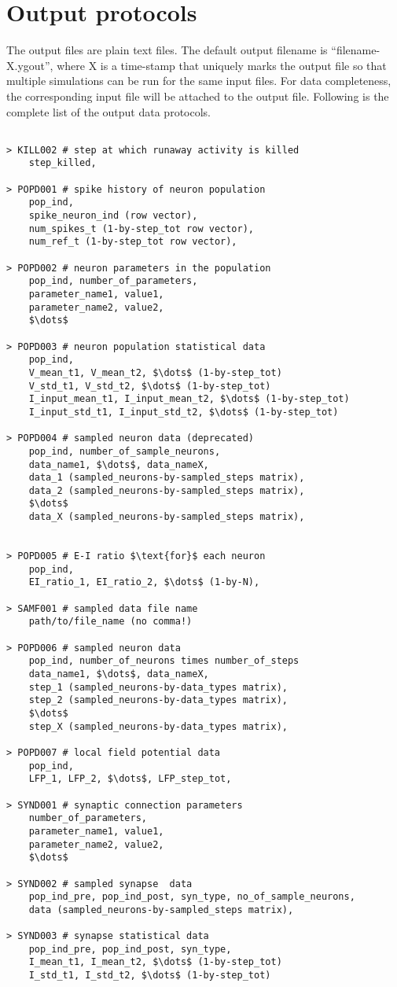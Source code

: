 \documentclass{article}
\begin{document}
\section{Output protocols}
\label{sec:Output protocols}
The output files are plain text files.
The default output filename is ``filename-X.ygout'', where X is a time-stamp that uniquely marks the output file so that multiple simulations can be run for the same input files.
For data completeness, the corresponding input file will be attached to the output file.
Following is the complete list of the output data protocols.
\begin{lstlisting}[mathescape]

> KILL002 # step at which runaway activity is killed
	step_killed,

> POPD001 # spike history of neuron population
	pop_ind,
	spike_neuron_ind (row vector),
	num_spikes_t (1-by-step_tot row vector),
	num_ref_t (1-by-step_tot row vector),

> POPD002 # neuron parameters in the population
	pop_ind, number_of_parameters,
	parameter_name1, value1,
	parameter_name2, value2,
	$\dots$

> POPD003 # neuron population statistical data
	pop_ind,
	V_mean_t1, V_mean_t2, $\dots$ (1-by-step_tot)
	V_std_t1, V_std_t2, $\dots$ (1-by-step_tot)
	I_input_mean_t1, I_input_mean_t2, $\dots$ (1-by-step_tot)
	I_input_std_t1, I_input_std_t2, $\dots$ (1-by-step_tot)
	
> POPD004 # sampled neuron data (deprecated)
	pop_ind, number_of_sample_neurons,
	data_name1, $\dots$, data_nameX,
	data_1 (sampled_neurons-by-sampled_steps matrix),
	data_2 (sampled_neurons-by-sampled_steps matrix),
	$\dots$
	data_X (sampled_neurons-by-sampled_steps matrix),


> POPD005 # E-I ratio $\text{for}$ each neuron
	pop_ind,
	EI_ratio_1, EI_ratio_2, $\dots$ (1-by-N),
	
> SAMF001 # sampled data file name
	path/to/file_name (no comma!)

> POPD006 # sampled neuron data
	pop_ind, number_of_neurons times number_of_steps
	data_name1, $\dots$, data_nameX,
	step_1 (sampled_neurons-by-data_types matrix),
	step_2 (sampled_neurons-by-data_types matrix),
	$\dots$
	step_X (sampled_neurons-by-data_types matrix),
	
> POPD007 # local field potential data
	pop_ind, 
	LFP_1, LFP_2, $\dots$, LFP_step_tot,
	
> SYND001 # synaptic connection parameters
	number_of_parameters,
	parameter_name1, value1,
	parameter_name2, value2,
	$\dots$

> SYND002 # sampled synapse  data
	pop_ind_pre, pop_ind_post, syn_type, no_of_sample_neurons,
	data (sampled_neurons-by-sampled_steps matrix),

> SYND003 # synapse statistical data
	pop_ind_pre, pop_ind_post, syn_type,
	I_mean_t1, I_mean_t2, $\dots$ (1-by-step_tot)
	I_std_t1, I_std_t2, $\dots$ (1-by-step_tot)
	
	

\end{lstlisting}

{}

\end{document}

